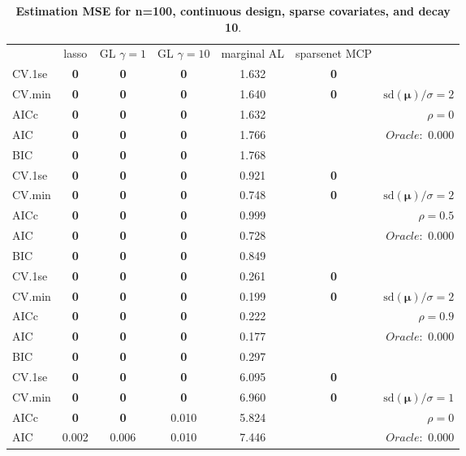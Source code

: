 \clearpage
\begin{table}\vspace{-.5cm}
\caption[l]{ { \bf Estimation MSE for n=100, continuous design, 
sparse covariates, and  decay  10}.}
\vspace{-.5cm}
\footnotesize{}
\begin{center}
\begin{tabular}{l*{5}{c}|r}
& lasso & GL $\gamma=1$ & GL $\gamma=10$ & marginal AL & sparsenet MCP  & \\
 \cline{1-7}
CV.1se & {\bf 0} & {\bf 0} & {\bf 0} & 1.632 & {\bf 0} & \\
CV.min & {\bf 0} & {\bf 0} & {\bf 0} & 1.640 & {\bf 0} &  $\mathrm{sd}(\mathbf{\mu})/\sigma=2$ \\
AICc & {\bf 0} & {\bf 0} & {\bf 0} & 1.632 & & $\rho=0$ \\
AIC & {\bf 0} & {\bf 0} & {\bf 0} & 1.766 & &  \multirow{2}{*}{$Oracle: $ 0.000} \\
BIC & {\bf 0} & {\bf 0} & {\bf 0} & 1.768 & &  \\
 \hline 
CV.1se & {\bf 0} & {\bf 0} & {\bf 0} & 0.921 & {\bf 0} & \\
CV.min & {\bf 0} & {\bf 0} & {\bf 0} & 0.748 & {\bf 0} &  $\mathrm{sd}(\mathbf{\mu})/\sigma=2$ \\
AICc & {\bf 0} & {\bf 0} & {\bf 0} & 0.999 & & $\rho=0.5$ \\
AIC & {\bf 0} & {\bf 0} & {\bf 0} & 0.728 & &  \multirow{2}{*}{$Oracle: $ 0.000} \\
BIC & {\bf 0} & {\bf 0} & {\bf 0} & 0.849 & &  \\
 \hline 
CV.1se & {\bf 0} & {\bf 0} & {\bf 0} & 0.261 & {\bf 0} & \\
CV.min & {\bf 0} & {\bf 0} & {\bf 0} & 0.199 & {\bf 0} &  $\mathrm{sd}(\mathbf{\mu})/\sigma=2$ \\
AICc & {\bf 0} & {\bf 0} & {\bf 0} & 0.222 & & $\rho=0.9$ \\
AIC & {\bf 0} & {\bf 0} & {\bf 0} & 0.177 & &  \multirow{2}{*}{$Oracle: $ 0.000} \\
BIC & {\bf 0} & {\bf 0} & {\bf 0} & 0.297 & &  \\
 \hline 
CV.1se & {\bf 0} & {\bf 0} & {\bf 0} & 6.095 & {\bf 0} & \\
CV.min & {\bf 0} & {\bf 0} & {\bf 0} & 6.960 & {\bf 0} &  $\mathrm{sd}(\mathbf{\mu})/\sigma=1$ \\
AICc & {\bf 0} & {\bf 0} & 0.010 & 5.824 & & $\rho=0$ \\
AIC & 0.002 & 0.006 & 0.010 & 7.446 & &  \multirow{2}{*}{$Oracle: $ 0.000} \\

\end{tabular}
\end{center}
\end{table}
